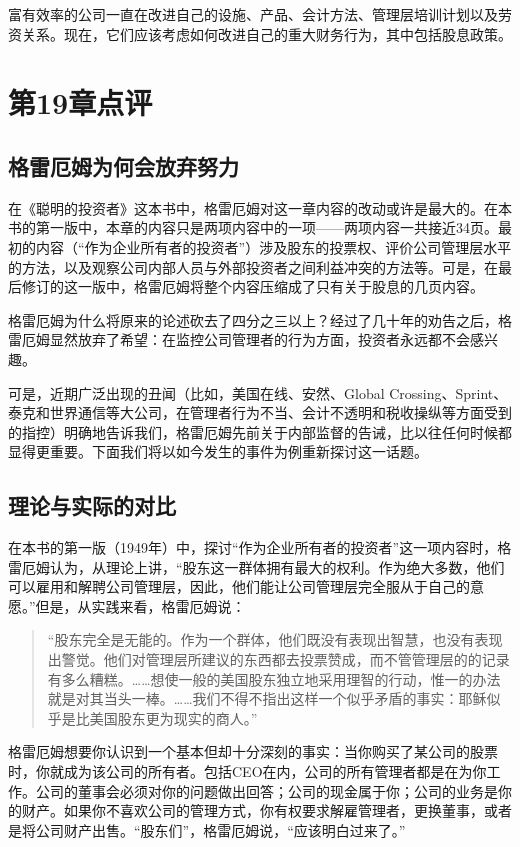 \documentclass[12pt,oneside]{book}
\begin{document}
富有效率的公司一直在改进自己的设施、产品、会计方法、管理层培训计划以及劳资关系。现在，它们应该考虑如何改进自己的重大财务行为，其中包括股息政策。





\section{第19章点评}
\subsection{格雷厄姆为何会放弃努力}
在《聪明的投资者》这本书中，格雷厄姆对这一章内容的改动或许是最大的。在本书的第一版中，本章的内容只是两项内容中的一项——两项内容一共接近34页。最初的内容（“作为企业所有者的投资者”）涉及股东的投票权、评价公司管理层水平的方法，以及观察公司内部人员与外部投资者之间利益冲突的方法等。可是，在最后修订的这一版中，格雷厄姆将整个内容压缩成了只有关于股息的几页内容。

格雷厄姆为什么将原来的论述砍去了四分之三以上？经过了几十年的劝告之后，格雷厄姆显然放弃了希望：在监控公司管理者的行为方面，投资者永远都不会感兴趣。

可是，近期广泛出现的丑闻（比如，美国在线、安然、Global Crossing、Sprint、泰克和世界通信等大公司，在管理者行为不当、会计不透明和税收操纵等方面受到的指控）明确地告诉我们，格雷厄姆先前关于内部监督的告诫，比以往任何时候都显得更重要。下面我们将以如今发生的事件为例重新探讨这一话题。

\subsection{理论与实际的对比}
在本书的第一版（1949年）中，探讨“作为企业所有者的投资者”这一项内容时，格雷厄姆认为，从理论上讲，“股东这一群体拥有最大的权利。作为绝大多数，他们可以雇用和解聘公司管理层，因此，他们能让公司管理层完全服从于自己的意愿。”但是，从实践来看，格雷厄姆说：

\begin{quote}
“股东完全是无能的。作为一个群体，他们既没有表现出智慧，也没有表现出警觉。他们对管理层所建议的东西都去投票赞成，而不管管理层的的记录有多么糟糕。……想使一般的美国股东独立地采用理智的行动，惟一的办法就是对其当头一棒。……我们不得不指出这样一个似乎矛盾的事实：耶稣似乎是比美国股东更为现实的商人。”
\end{quote}

格雷厄姆想要你认识到一个基本但却十分深刻的事实：当你购买了某公司的股票时，你就成为该公司的所有者。包括CEO在内，公司的所有管理者都是在为你工作。公司的董事会必须对你的问题做出回答；公司的现金属于你；公司的业务是你的财产。如果你不喜欢公司的管理方式，你有权要求解雇管理者，更换董事，或者是将公司财产出售。“股东们”，格雷厄姆说，“应该明白过来了。”
\end{document}
